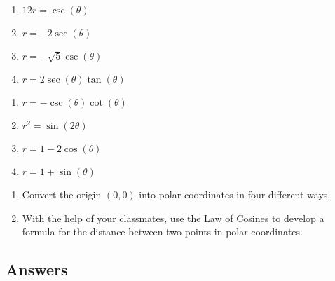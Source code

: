 \begin{multicols}{4} 

\begin{enumerate}

\setcounter{enumi}{\value{HW}}

\item $12r = \csc(\theta)$
\item $r = -2\sec(\theta)$
\item $r = -\sqrt{5} \csc(\theta)$ 
\item \small $r = 2\sec(\theta)\tan(\theta)$ \normalsize

\setcounter{HW}{\value{enumi}}

\end{enumerate}

\end{multicols}

\begin{multicols}{4} 

\begin{enumerate}

\setcounter{enumi}{\value{HW}}

\item \small $r = -\csc(\theta) \cot(\theta)$ \normalsize
\item $r^{2} = \sin(2\theta)$
\item $r = 1 - 2\cos(\theta)$
\item $r = 1 + \sin(\theta)$ \label{equpolartorectlast}

\setcounter{HW}{\value{enumi}}

\end{enumerate}

\end{multicols}

\begin{enumerate}

\setcounter{enumi}{\value{HW}}

\item Convert the origin $(0,0)$ into polar coordinates in four different ways.

\item With the help of your classmates, use the Law of Cosines to develop a formula for the distance between two points in polar coordinates.

\setcounter{HW}{\value{enumi}}

\end{enumerate}

\newpage

\subsection{Answers}

